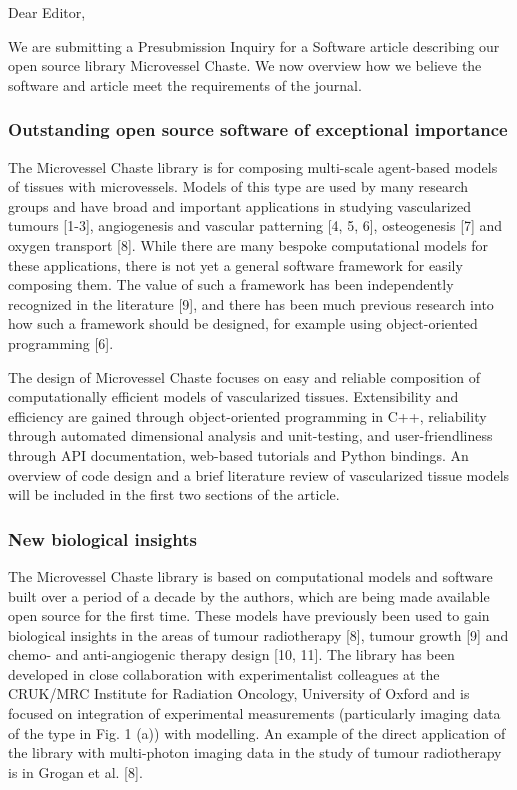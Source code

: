 \documentclass[fullpage,11pt]{article}
\begin{document}
  

\noindent Dear Editor,

\noindent We are submitting a Presubmission Inquiry for a Software article describing our open source library Microvessel Chaste.  We now overview how we believe the software and article meet the requirements of the journal.

\subsubsection*{Outstanding open source software of exceptional importance}
The Microvessel Chaste library is for composing multi-scale agent-based models of tissues with microvessels. Models of this type are used by many research groups and have broad and important applications in studying vascularized tumours [1-3], angiogenesis and vascular patterning [4, 5, 6],  osteogenesis [7] and oxygen transport [8]. While there are many bespoke computational models for these applications, there is not yet a general software framework for easily composing them. The value of such a framework has been independently recognized in the literature [9], and there has been much previous research into how such a framework should be designed, for example using object-oriented programming [6].

The design of Microvessel Chaste focuses on easy and reliable composition of computationally efficient models of vascularized tissues. Extensibility and efficiency are gained through object-oriented programming in C++, reliability through automated dimensional analysis and unit-testing, and user-friendliness through API documentation, web-based tutorials and Python bindings. An overview of code design and a brief literature review of vascularized tissue models will be included in the first two sections of the article.

\subsubsection*{New biological insights}
The Microvessel Chaste library is based on computational models and software built over a period of a decade by the authors, which are being made available open source for the first time. These models have previously been used to gain biological insights in the areas of tumour radiotherapy [8], tumour growth [9] and chemo- and anti-angiogenic therapy design [10, 11]. The library has been developed in close collaboration with experimentalist colleagues at the CRUK/MRC Institute for Radiation Oncology, University of Oxford and is focused on integration of experimental measurements (particularly imaging data of the type in Fig. 1 (a)) with modelling. An example of the direct application of the library with multi-photon imaging data in the study of tumour radiotherapy is in Grogan et al. [8].
\end{document}
